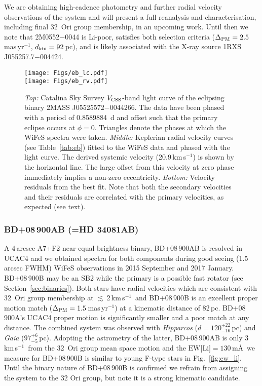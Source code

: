 \documentclass[usenatbib]{mnras}
\newcommand{\masyr}{mas\,yr$^{-1}$}
\newcommand{\kms}{\textrm{km\,s$^{-1}$}}
\begin{document}
We are obtaining high-cadence photometry and further radial velocity observations of the system and will present a full reanalysis and characterisation, including final 32~Ori group membership, in an upcoming work. Until then we note that 2M0552$-$0044 is Li-poor, satisfies both selection criteria ($\Delta_{\rm{PM}}=2.5$\,\masyr, $d_{\rm{kin}}=92$\,pc), and is likely associated with the X-ray source 1RXS\,J055257.7$-$004424.


\begin{figure}
\centering
\texttt{[image: Figs/eb\_lc.pdf]}\\
\texttt{[image: Figs/eb\_rv.pdf]}
\caption[]{\emph{Top:} Catalina Sky Survey $V_{\rm CSS}$-band light curve of the eclipsing binary 2MASS J05525572$-$0044266.
The data have been phased with a period of 0.8589884~d \protect\citep{Drake14} and offset such that the primary eclipse occurs at $\phi=0$. Triangles denote the
phases at which the WiFeS spectra were taken. \emph{Middle:} Keplerian radial velocity curves  (see Table~\ref{tab:eb}) fitted to the WiFeS data and phased with the light curve. The derived systemic velocity (20.9\,\kms) is shown by the horizontal line. The large offset from this velocity at zero phase immediately implies a non-zero eccentricity. \emph{Bottom:}  Velocity residuals from the best fit. Note that both the secondary velocities and their residuals are correlated with the primary velocities, as expected (see text).}
\label{fig:eb}
\end{figure}


\subsubsection{BD+08\,900AB (=HD 34081AB)}

A 4\,arcsec A7+F2 near-equal brightness binary,
BD+08\,900AB is resolved in UCAC4 and we obtained spectra for both
components during good seeing (1.5\,arcsec FWHM) WiFeS observations in
2015 September and 2017 January. BD+08\,900B may be an SB2 while the primary is a
possible fast rotator (see Section~\ref{sec:binaries}). Both stars have radial velocities which are
consistent with 32~Ori group membership at $\lesssim$\,2\,\kms\ and
BD+08\,900B is an excellent proper motion match ($\Delta_{\rm
  PM}=1.5$\,\masyr) at a kinematic distance of 82\,pc. BD+08\,900A's
UCAC4 proper motion is significantly smaller and a poor match at any
distance. The combined system was observed with \emph{Hipparcos}
($d=120_{-16}^{+22}$\,pc) and \emph{Gaia} ($97^{+6}_{-5}$\,pc). Adopting
the astrometry of the latter, BD+08\,900AB is only 3\,\kms\ from the
32~Ori group mean space motion and the
$\textrm{EW[Li]}=130$\,m\AA\ we measure for BD+08\,900B is similar to
young F-type stars in Fig.~\ref{fig:ew_li}.  Until
the binary nature of BD+08\,900B is confirmed we refrain from assigning the system to
the 32 Ori group, but note it is a strong kinematic candidate.
\end{document}
